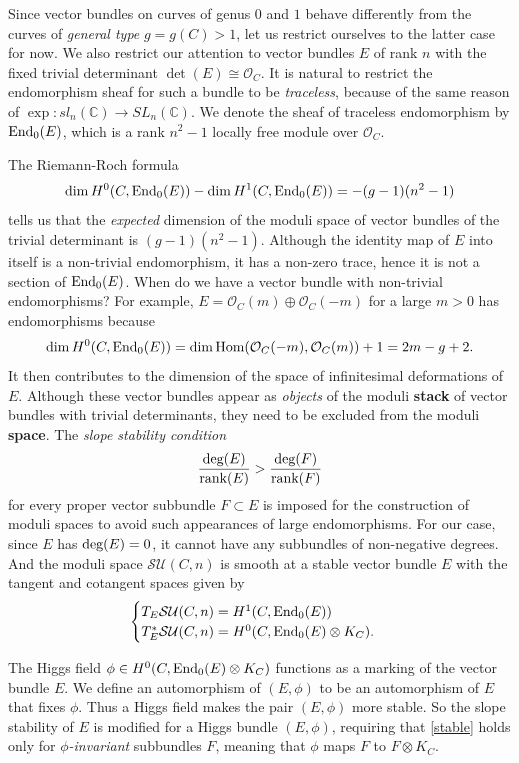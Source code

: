 \documentclass{amsart}
\theoremstyle{definition}
\numberwithin{equation}{section}
\numberwithin{figure}{section}
\def\Hom{{\text{\rm{Hom}}}}
\def\End{{\text{\rm{End}}}}
\def\isom{\cong}
\def\tensor{\otimes}
\def\dsum{\oplus}
\def\deg{{\text{\rm{deg}}}}
\def\rank{{\text{\rm{rank}}}}
\newcommand{\be}{\begin{equation}}
\newcommand{\ee}{\end{equation}}
\newcommand{\bC}{{\mathbb{C}}}
\newcommand{\cO}{{\mathcal{O}}}
\newcommand{\cS}{{\mathcal{S}}}
\newcommand{\cU}{{\mathcal{U}}}
\newcommand{\lrar}{\longrightarrow}
\begin{document}
Since vector bundles on curves of genus $0$ and $1$ behave
differently from the  curves of \emph{general type} $g=g(C)>1$, 
let us restrict ourselves to  the latter case for now. We also
restrict our attention to vector bundles $E$ of rank $n$ with the fixed
trivial determinant $\det(E)\isom \cO_C$. It is natural 
to restrict the endomorphism sheaf
for such a bundle to be \emph{traceless}, because of the
same reason of $\exp: sl_n(\bC)\lrar SL_n(\bC)$. 
We denote the sheaf of traceless endomorphism by $\End_0(E)$,
which is a rank $n^2-1$ locally free module over $\cO_C$. 


The Riemann-Roch formula
\be
\label{RR}
\dim H^0(C,\End_0(E)) - \dim H^1(C,\End_0(E)) = -(g-1)(n^2-1)
\ee
tells us that the \emph{expected} dimension of the moduli space
of  vector bundles of the  trivial determinant 
is $(g-1)(n^2-1)$. Although the 
identity map of $E$ into itself is a non-trivial endomorphism, it
has a non-zero trace, hence it is not a section of $\End_0(E)$.
When do we have a vector bundle with non-trivial endomorphisms?
For example,  $E=\cO_C(m)\dsum \cO_C(-m)$ for a large $m>0$
has endomorphisms because
$$
\dim H^0(C,\End_0(E))=\dim \Hom(\cO_C(-m),\cO_C(m)) +1 = 2m-g+2.
$$
It then contributes to the dimension of the space of
infinitesimal deformations of $E$. Although these vector bundles appear
as  \emph{objects} 
of the moduli \textbf{stack} of vector bundles with trivial determinants,
they need to be excluded from the moduli \textbf{space}.
The \emph{slope stability condition} 
\be
\label{stable}
\frac{\deg(E)}{\rank(E)}> \frac{\deg(F)}{\rank(F)}
\ee
for every proper vector subbundle
$F\subset E$ is imposed for the construction of moduli spaces
to avoid such appearances of large endomorphisms.
For our case, since $E$ has $\deg(E) = 0$, it cannot have any 
subbundles of non-negative degrees. And the 
moduli space $\cS \cU (C,n)$ is smooth at a stable vector bundle 
$E$ with the tangent and cotangent spaces given by
$$
\begin{cases}
T_E \cS \cU (C,n) = H^1(C,\End_0(E))\\
T^*_E \cS \cU (C,n) =H^0(C,\End_0(E)\tensor K_C).
\end{cases}
$$

The Higgs field $\phi\in H^0(C,\End_0(E)\tensor K_C)$ functions as
a marking of the vector bundle $E$. We define an automorphism 
of $(E,\phi)$ to be an automorphism of $E$ that fixes  $\phi$. 
Thus a Higgs field makes the pair $(E,\phi)$ more stable. So
the slope stability of $E$ is modified for a Higgs bundle $(E,\phi)$, 
requiring that \eqref{stable} holds only for \emph{$\phi$-invariant}
subbundles $F$, meaning that $\phi$ maps $F$ to $F\tensor K_C$.
\end{document}

